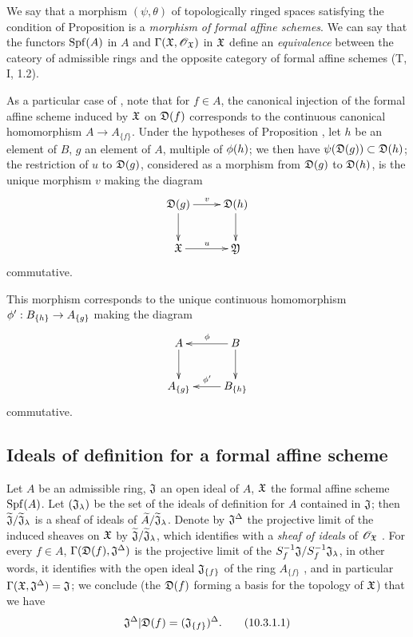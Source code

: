 We say that a morphism $(\psi,\theta)$ of topologically ringed spaces satisfying the condition of Proposition  is a \emph{morphism of formal affine schemes}.
We can say that the functors ${\mathop{\mathrm{Spf}}\nolimits}(A)$ in $A$ and $\Gamma(\mathfrak{X},\mathscr{O}_\mathfrak{X})$ in $\mathfrak{X}$ define an \emph{equivalence} between the cateory of admissible rings and the opposite category of formal affine schemes (T, I, 1.2).

\begin{env}[10.2.3]
\label{1.10.2.3}
As a particular case of , note that for $f\in A$, the canonical injection of the formal affine scheme induced by $\mathfrak{X}$ on $\mathfrak{D}(f)$ corresponds to the continuous canonical homomorphism $A\to A_{\{f\}}$.
Under the hypotheses of Proposition , let $h$ be an element of $B$, $g$ an element of $A$, multiple of $\phi(h)$; we then have $\psi(\mathfrak{D}(g))\subset\mathfrak{D}(h)$; the restriction of $u$ to $\mathfrak{D}(g)$, considered as a morphism from $\mathfrak{D}(g)$ to $\mathfrak{D}(h)$, is the unique morphism $v$ making the diagram
\[
  \xymatrix{
    \fk{D}(g)\ar[r]^v\ar[d] &
    \fk{D}(h)\ar[d]\\
    \fk{X}\ar[r]^u &
    \fk{Y}
  }
\]
commutative.

This morphism corresponds to the unique continuous homomorphism $\vphi':B_{\{h\}}\to A_{\{g\}}$  making the diagram
\[
  \xymatrix{
    A\ar[d] &
    B\ar[l]_\vphi\ar[d]\\
    A_{\{g\}} &
    B_{\{h\}}\ar[l]_{\vphi'}
  }
\]
commutative.
\end{env}

\subsection{Ideals of definition for a formal affine scheme}
\label{subsection-ideals-of-definition-formal}

\begin{env}[10.3.1]
\label{1.10.3.1}
Let $A$ be an admissible ring, $\mathfrak{J}$ an open ideal of $A$, $\mathfrak{X}$ the formal affine scheme ${\mathop{\mathrm{Spf}}\nolimits}(A)$.
Let $(\mathfrak{J}_\lambda)$ be the set of the ideals of definition for $A$ contained in $\mathfrak{J}$; then $\widetilde{\mathfrak{J}}/\widetilde{\mathfrak{J}}_\lambda$ is a sheaf of ideals of $\widetilde{A}/\widetilde{\mathfrak{J}}_\lambda$.
Denote by $\mathfrak{J}^\Delta$ the projective limit of the induced sheaves on $\mathfrak{X}$ by $\widetilde{\mathfrak{J}}/\widetilde{\mathfrak{J}}_\lambda$, which identifies with a \emph{sheaf of ideals} of $\mathscr{O}_\mathfrak{X}$ .
For every $f\in A$, $\Gamma(\mathfrak{D}(f),\mathfrak{J}^\Delta)$ is the projective limit of the $S_f^{-1}\mathfrak{J}/S_f^{-1}\mathfrak{J}_\lambda$, in other words, it identifies with the open ideal $\mathfrak{J}_{\{f\}}$ of the ring $A_{\{f\}}$ , and in particular $\Gamma(\mathfrak{X},\mathfrak{J}^\Delta)=\mathfrak{J}$; we conclude (the $\mathfrak{D}(f)$ forming a basis for the topology of $\mathfrak{X}$) that we have
\[
  \mathfrak{J}^\Delta|\mathfrak{D}(f)=(\mathfrak{J}_{\{f\}})^\Delta.
  \tag{10.3.1.1}
\]
\end{env}

